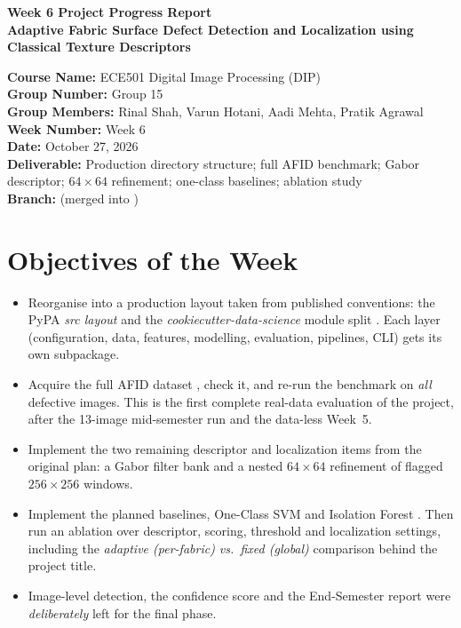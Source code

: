 \documentclass[11pt,a4paper]{article}
\newcommand{\code}[1]{\texttt{\detokenize{#1}}}
\begin{document}
\begin{center}
{\LARGE\bfseries Week 6 Project Progress Report}\\[4pt]
{\large\bfseries Adaptive Fabric Surface Defect Detection and Localization using\\ Classical Texture Descriptors}
\end{center}

\noindent
\textbf{Course Name:} ECE501 Digital Image Processing (DIP)\\
\textbf{Group Number:} Group 15\\
\textbf{Group Members:} Rinal Shah, Varun Hotani, Aadi Mehta, Pratik Agrawal\\
\textbf{Week Number:} Week 6\\
\textbf{Date:} October 27, 2026\\
\textbf{Deliverable:} Production directory structure; full AFID benchmark; Gabor descriptor; $64\times64$ refinement; one-class baselines; ablation study\\
\textbf{Branch:} \code{feat/week-6} (merged into \code{main})

\section*{Objectives of the Week}
\begin{itemize}
  \item Reorganise \code{Codes/} into a production layout taken from published conventions: the PyPA \emph{src layout} \cite{pypa} and the \emph{cookiecutter-data-science} module split \cite{ccds}. Each layer (configuration, data, features, modelling, evaluation, pipelines, CLI) gets its own subpackage.
  \item Acquire the full AFID dataset \cite{silvestre2019}, check it, and re-run the benchmark on \emph{all} defective images. This is the first complete real-data evaluation of the project, after the 13-image mid-semester run and the data-less Week~5.
  \item Implement the two remaining descriptor and localization items from the original plan: a Gabor filter bank \cite{jain1991} and a nested $64\times64$ refinement of flagged $256\times256$ windows.
  \item Implement the planned baselines, One-Class SVM \cite{scholkopf2001} and Isolation Forest \cite{liu2008}. Then run an ablation over descriptor, scoring, threshold and localization settings, including the \emph{adaptive (per-fabric) vs.\ fixed (global)} comparison behind the project title.
  \item Image-level detection, the confidence score and the End-Semester report were \emph{deliberately} left for the final phase.
\end{itemize}
\end{document}
